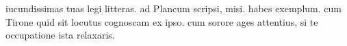 


 iucundissimas tuas legi litteras. ad Plancum scripsi, misi. habes exemplum. cum Tirone quid sit locutus cognoscam ex ipso. cum sorore ages attentius, si te occupatione ista relaxaris.
